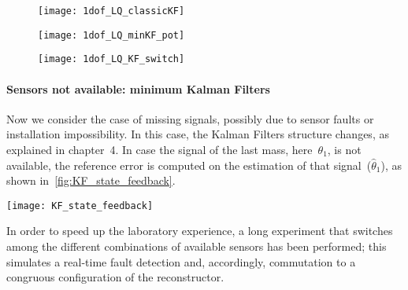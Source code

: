 \begin{figure*}
	\centering
	\begin{subfigure}{0.45\columnwidth}
		\texttt{[image: 1dof\_LQ\_classicKF]}
		\label{fig:1dof_LQ_classicKF}
	\end{subfigure}
	\begin{subfigure}{0.45\columnwidth}
		\texttt{[image: 1dof\_LQ\_minKF\_pot]}
		\label{fig:1dof_LQ_minKF_pot}
	\end{subfigure}
	\newline
	\begin{subfigure}{\columnwidth}
		\centering
		\texttt{[image: 1dof\_LQ\_KF\_switch]}
		\label{fig:1dof_LQ_KF_switch}
	\end{subfigure}
	\caption{LQG with different sensors available, \onedof\ case}
\end{figure*}

\paragraph{Sensors not available: minimum Kalman Filters}

Now we consider the case of missing signals, possibly due to sensor faults or installation impossibility. In this case, the Kalman Filters structure changes, as explained in chapter~4. In case the signal of the last mass, here~$\theta_1$, is not available, the reference error is computed on the estimation of that signal~($\hat\theta_1$), as shown in~\cref{fig:KF_state_feedback}. \\

\begin{figure*}
	\centering
	\texttt{[image: KF\_state\_feedback]}
	\caption{State measurement not available: estimated state feedback, \onedof\ case}
	\label{fig:KF_state_feedback}
\end{figure*}

In order to speed up the laboratory experience, a long experiment that switches among the different combinations of available sensors has been performed; this simulates a real-time fault detection and, accordingly, commutation to a congruous configuration of the reconstructor.

